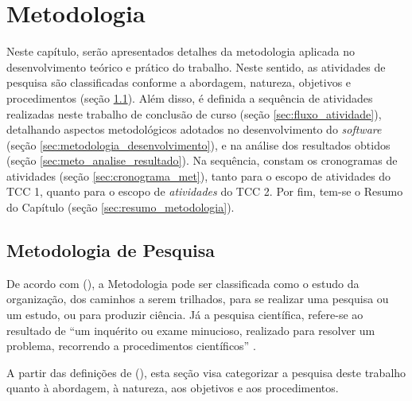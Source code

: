 \chapter[Metodologia]{Metodologia}

\label{chap:metodologia}

Neste capítulo, serão apresentados detalhes da metodologia aplicada no desenvolvimento teórico e prático do trabalho. Neste sentido, as atividades de pesquisa são classificadas conforme a abordagem, natureza, objetivos e procedimentos (seção \ref{sec:met_pesquisa}). Além disso, é definida a sequência de atividades realizadas neste trabalho de conclusão de curso (seção \ref{sec:fluxo_atividade}), detalhando aspectos metodológicos adotados no desenvolvimento do \textit{software} (seção \ref{sec:metodologia_desenvolvimento}), e na análise dos resultados obtidos (seção \ref{sec:meto_analise_resultado}). Na sequência, constam os cronogramas de atividades (seção \ref{sec:cronograma_met}), tanto para o escopo de atividades do TCC 1, quanto para o escopo de \textit{atividades} do TCC 2. Por fim, tem-se o Resumo do Capítulo (seção \ref{sec:resumo_metodologia}).

\section{Metodologia de Pesquisa}
\label{sec:met_pesquisa}
De acordo com  (\citeyear{gerhardt2009metodos}), a Metodologia pode ser classificada como o estudo da organização, dos caminhos a serem trilhados, para se realizar uma pesquisa ou um estudo, ou para produzir ciência. Já a pesquisa científica, refere-se ao resultado de “um inquérito ou exame minucioso, realizado para resolver um problema, recorrendo a procedimentos científicos” \cite{gerhardt2009metodos}.

A partir das definições de  (\citeyear{gerhardt2009metodos}), esta seção visa categorizar a pesquisa deste trabalho quanto à abordagem, à natureza, aos objetivos e aos procedimentos.

